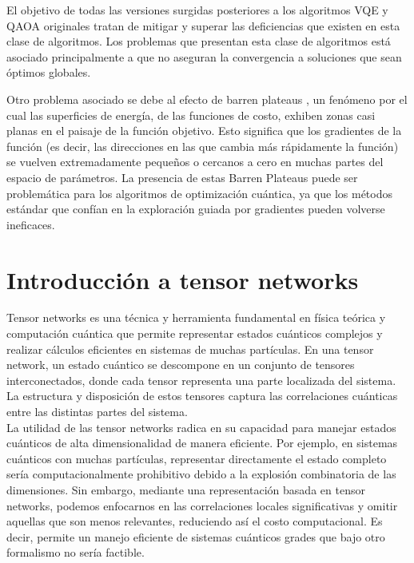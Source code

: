 El objetivo de todas las versiones surgidas posteriores a los algoritmos VQE y QAOA originales tratan de mitigar y superar las deficiencias que existen en esta clase de algoritmos. Los problemas que presentan esta clase de algoritmos está asociado principalmente a que no aseguran la convergencia a soluciones que sean óptimos globales.

\newpage

Otro problema asociado se debe al efecto de barren plateaus \citep{mcClean}, un fenómeno por el cual las superficies de energía, de las funciones de costo, exhiben zonas casi planas en el paisaje de la función objetivo. Esto significa que los gradientes de la función (es decir, las direcciones en las que cambia más rápidamente la función) se vuelven extremadamente pequeños o cercanos a cero en muchas partes del espacio de parámetros. La presencia de estas Barren Plateaus puede ser problemática para los algoritmos de optimización cuántica, ya que los métodos estándar que confían en la exploración guiada por gradientes pueden volverse ineficaces. 

\section{Introducción a tensor networks}


Tensor networks es una técnica y herramienta fundamental en física teórica y computación cuántica que permite representar estados cuánticos complejos y realizar cálculos eficientes en sistemas de muchas partículas. En una tensor network, un estado cuántico se descompone en un conjunto de tensores interconectados, donde cada tensor representa una parte localizada del sistema. La estructura y disposición de estos tensores captura las correlaciones cuánticas entre las distintas partes del sistema. \\

La utilidad de las tensor networks radica en su capacidad para manejar estados cuánticos de alta dimensionalidad de manera eficiente. Por ejemplo, en sistemas cuánticos con muchas partículas, representar directamente el estado completo sería computacionalmente prohibitivo debido a la explosión combinatoria de las dimensiones. Sin embargo, mediante una representación basada en tensor networks, podemos enfocarnos en las correlaciones locales significativas y omitir aquellas que son menos relevantes, reduciendo así el costo computacional. Es decir, permite un manejo eficiente de sistemas cuánticos grades que bajo otro formalismo no sería factible. \\


